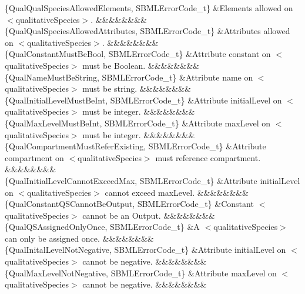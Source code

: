 \begin{DoxyParagraph}{}
\begin{longtabu}
\{Qual\+Qual\+Species\+Allowed\+Elements, S\+B\+M\+L\+Error\+Code\+\_\+t\} &Elements allowed on {\ttfamily $<$qualitative\+Species$>$}. &&&&&&&&\\
\{Qual\+Qual\+Species\+Allowed\+Attributes, S\+B\+M\+L\+Error\+Code\+\_\+t\} &Attributes allowed on {\ttfamily $<$qualitative\+Species$>$}. &&&&&&&&\\
\{Qual\+Constant\+Must\+Be\+Bool, S\+B\+M\+L\+Error\+Code\+\_\+t\} &Attribute \textquotesingle{}constant\textquotesingle{} on {\ttfamily $<$qualitative\+Species$>$} must be Boolean. &&&&&&&&\\
\{Qual\+Name\+Must\+Be\+String, S\+B\+M\+L\+Error\+Code\+\_\+t\} &Attribute \textquotesingle{}name\textquotesingle{} on {\ttfamily $<$qualitative\+Species$>$} must be string. &&&&&&&&\\
\{Qual\+Initial\+Level\+Must\+Be\+Int, S\+B\+M\+L\+Error\+Code\+\_\+t\} &Attribute \textquotesingle{}initial\+Level\textquotesingle{} on {\ttfamily $<$qualitative\+Species$>$} must be integer. &&&&&&&&\\
\{Qual\+Max\+Level\+Must\+Be\+Int, S\+B\+M\+L\+Error\+Code\+\_\+t\} &Attribute \textquotesingle{}max\+Level\textquotesingle{} on {\ttfamily $<$qualitative\+Species$>$} must be integer. &&&&&&&&\\
\{Qual\+Compartment\+Must\+Refer\+Existing, S\+B\+M\+L\+Error\+Code\+\_\+t\} &Attribute \textquotesingle{}compartment\textquotesingle{} on {\ttfamily $<$qualitative\+Species$>$} must reference compartment. &&&&&&&&\\
\{Qual\+Initial\+Level\+Cannot\+Exceed\+Max, S\+B\+M\+L\+Error\+Code\+\_\+t\} &Attribute \textquotesingle{}initial\+Level\textquotesingle{} on {\ttfamily $<$qualitative\+Species$>$} cannot exceed max\+Level. &&&&&&&&\\
\{Qual\+Constant\+Q\+S\+Cannot\+Be\+Output, S\+B\+M\+L\+Error\+Code\+\_\+t\} &Constant {\ttfamily $<$qualitative\+Species$>$} cannot be an Output. &&&&&&&&\\
\{Qual\+Q\+S\+Assigned\+Only\+Once, S\+B\+M\+L\+Error\+Code\+\_\+t\} &A {\ttfamily $<$qualitative\+Species$>$} can only be assigned once. &&&&&&&&\\
\{Qual\+Inital\+Level\+Not\+Negative, S\+B\+M\+L\+Error\+Code\+\_\+t\} &Attribute \textquotesingle{}initial\+Level\textquotesingle{} on {\ttfamily $<$qualitative\+Species$>$} cannot be negative. &&&&&&&&\\
\{Qual\+Max\+Level\+Not\+Negative, S\+B\+M\+L\+Error\+Code\+\_\+t\} &Attribute \textquotesingle{}max\+Level\textquotesingle{} on {\ttfamily $<$qualitative\+Species$>$} cannot be negative. &&&&&&&&\\

\end{longtabu}
\end{DoxyParagraph}
